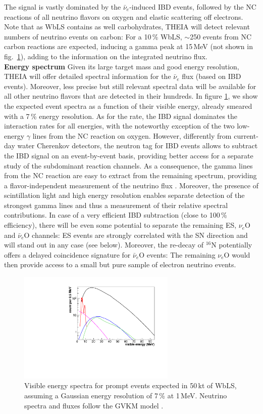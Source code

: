  The signal is vastly dominated by the $\bar\nu_e$-induced IBD events, followed by the NC reactions of all neutrino flavors on oxygen and elastic scattering off electrons. Note that as WbLS contains as well carbohydrates, THEIA will detect relevant numbers of neutrino events on carbon: For a 10\,\% WbLS, $\sim$250 events from NC carbon reactions are expected, inducing a gamma peak at 15\,MeV (not shown in fig.~\ref{fig:snspectra}), adding to the information on the integrated neutrino flux.
\medskip\\
{\bf Energy spectrum} Given its large target mass and good energy resolution, THEIA will offer detailed spectral information for the $\bar\nu_e$ flux (based on IBD events). Moreover, less precise but still relevant spectral data will be available for all other neutrino flavors that are detected in their hundreds. In figure \ref{fig:snspectra}, we show the expected event spectra as a function of their visible energy, already smeared with a 7\,\% energy resolution. As for the rate, the IBD signal dominates the interaction rates for all energies, with the noteworthy exception of the two low-energy $\gamma$ lines from the NC reaction on oxygen. However, differently from current-day water Cherenkov detectors, the neutron tag for IBD events allows to subtract the IBD signal on an event-by-event basis, providing better access for a separate study of the subdominant reaction channels. As a consequence, the gamma lines from the NC reaction are easy to extract from the remaining spectrum, providing a flavor-independent measurement of the neutrino flux \cite{Langanke:1995he,Haxton:1987kc}. Moreover, the presence of scintillation light and high energy resolution enables separate detection of the strongest gamma lines and thus a measurement of their relative spectral contributions. In case of a very efficient IBD subtraction (close to 100\,\% efficiency), there will be even some potential to separate the remaining ES, $\nu_e$O and $\bar\nu_e$O channels: ES events are strongly correlated with the SN direction and will stand out in any case (see below). Moreover, the re-decay of $^{16}$N potentially offers a delayed coincidence signature for $\bar\nu_e$O events: The remaining $\nu_e$O would then provide access to a small but pure sample of electron neutrino events. 
\begin{figure}[h!]
\centering
\includegraphics[width=0.67\textwidth]{pics/sn_spectra.pdf}
\caption{Visible energy spectra for prompt events expected in 50\,kt of WbLS, assuming a Gaussian energy resolution of 7\,\% at 1\,MeV. Neutrino spectra and fluxes follow the GVKM model \cite{Gava:2009pj}.}
\label{fig:snspectra}
\end{figure}
